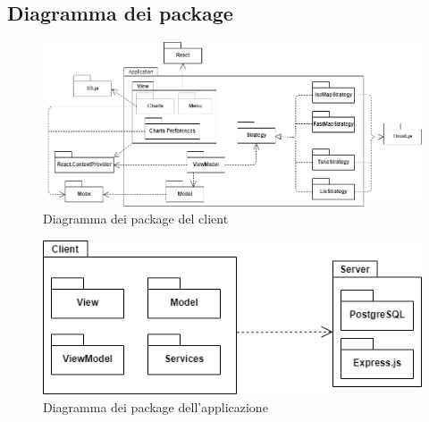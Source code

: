 \subsection{Diagramma dei package}
\begin{figure}[hb]
\includegraphics[width=18cm]{Images/Allegato Tecnico-Package}
\centering
\caption{Diagramma dei package del client}
\end{figure}
\begin{figure}[hb]
\includegraphics[width=12cm]{Images/Allegato Tecnico-Package 2}
\centering
\caption{Diagramma dei package dell'applicazione}
\end{figure}
\newpage

